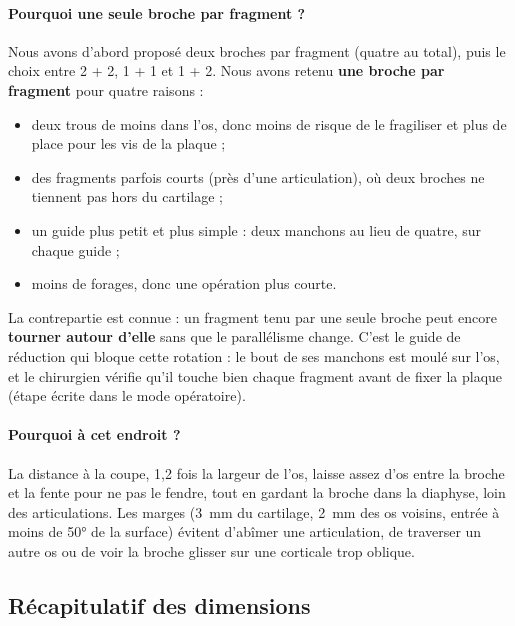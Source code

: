\documentclass[11pt,a4paper]{article}
\begin{document}
\paragraph{Pourquoi une seule broche par fragment ?} Nous avons d'abord proposé deux broches par fragment (quatre au
total), puis le choix entre 2 + 2, 1 + 1 et 1 + 2. Nous avons retenu \textbf{une broche par fragment} pour quatre
raisons :
\begin{itemize}
  \item deux trous de moins dans l'os, donc moins de risque de le fragiliser et plus de place pour les vis de la
        plaque ;
  \item des fragments parfois courts (près d'une articulation), où deux broches ne tiennent pas hors du cartilage ;
  \item un guide plus petit et plus simple : deux manchons au lieu de quatre, sur chaque guide ;
  \item moins de forages, donc une opération plus courte.
\end{itemize}
La contrepartie est connue : un fragment tenu par une seule broche peut encore \textbf{tourner autour d'elle} sans que
le parallélisme change. C'est le guide de réduction qui bloque cette rotation : le bout de ses manchons est moulé sur
l'os, et le chirurgien vérifie qu'il touche bien chaque fragment avant de fixer la plaque (étape écrite dans le mode
opératoire).

\paragraph{Pourquoi à cet endroit ?} La distance à la coupe, 1,2 fois la largeur de l'os, laisse assez d'os entre la
broche et la fente pour ne pas le fendre, tout en gardant la broche dans la diaphyse, loin des articulations. Les
marges (3~mm du cartilage, 2~mm des os voisins, entrée à moins de 50° de la surface) évitent d'abîmer une articulation,
de traverser un autre os ou de voir la broche glisser sur une corticale trop oblique.

\subsection{Récapitulatif des dimensions}
\end{document}
